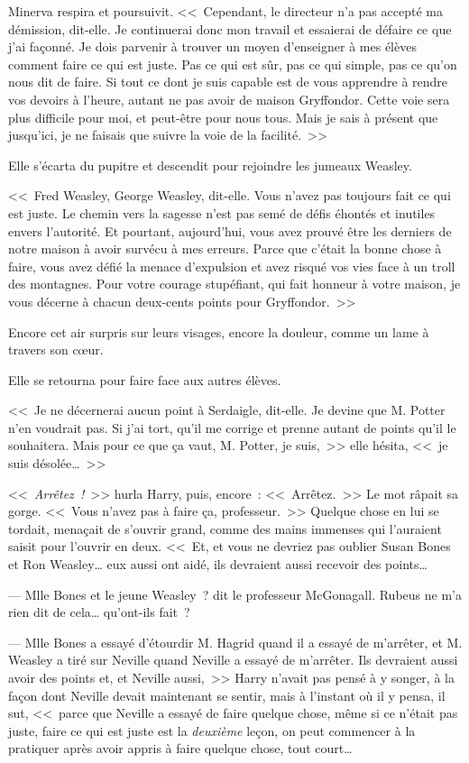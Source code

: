 Minerva respira et poursuivit. <<~Cependant, le directeur n'a pas accepté ma démission, dit-elle. Je continuerai donc mon travail et essaierai de défaire ce que j'ai façonné. Je dois parvenir à trouver un moyen d'enseigner à mes élèves comment faire ce qui est juste. Pas ce qui est sûr, pas ce qui simple, pas ce qu'on nous dit de faire. Si tout ce dont je suis capable est de vous apprendre à rendre vos devoirs à l'heure, autant ne pas avoir de maison Gryffondor. Cette voie sera plus difficile pour moi, et peut-être pour nous tous. Mais je sais à présent que jusqu'ici, je ne faisais que suivre la voie de la facilité.~>>

Elle s'écarta du pupitre et descendit pour rejoindre les jumeaux Weasley.

<<~Fred Weasley, George Weasley, dit-elle. Vous n'avez pas toujours fait ce qui est juste. Le chemin vers la sagesse n'est pas semé de défis éhontés et inutiles envers l'autorité. Et pourtant, aujourd'hui, vous avez prouvé être les derniers de notre maison à avoir survécu à mes erreurs. Parce que c'était la bonne chose à faire, vous avez défié la menace d'expulsion et avez risqué vos vies face à un troll des montagnes. Pour votre courage stupéfiant, qui fait honneur à votre maison, je vous décerne à chacun deux-cents points pour Gryffondor.~>>

Encore cet air surpris sur leurs visages, encore la douleur, comme un lame à travers son cœur.

Elle se retourna pour faire face aux autres élèves.

<<~Je ne décernerai aucun point à Serdaigle, dit-elle. Je devine que M. Potter n'en voudrait pas. Si j'ai tort, qu'il me corrige et prenne autant de points qu'il le souhaitera. Mais pour ce que ça vaut, M. Potter, je suis,~>> elle hésita, <<~je suis désolée…~>>

\later

<<~\emph{Arrêtez~!}~>> hurla Harry, puis, encore~: <<~Arrêtez.~>> Le mot râpait sa gorge. <<~Vous n'avez pas à faire ça, professeur.~>> Quelque chose en lui se tordait, menaçait de s'ouvrir grand, comme des mains immenses qui l'auraient saisit pour l'ouvrir en deux. <<~Et, et vous ne devriez pas oublier Susan Bones et Ron Weasley… eux aussi ont aidé, ils devraient aussi recevoir des points…

--- Mlle Bones et le jeune Weasley~? dit le professeur McGonagall. Rubeus ne m'a rien dit de cela… qu'ont-ils fait~?

--- Mlle Bones a essayé d'étourdir M. Hagrid quand il a essayé de m'arrêter, et M. Weasley a tiré sur Neville quand Neville a essayé de m'arrêter. Ils devraient aussi avoir des points et, et Neville aussi,~>> Harry n'avait pas pensé à y songer, à la façon dont Neville devait maintenant se sentir, mais à l'instant où il y pensa, il sut, <<~parce que Neville a essayé de faire quelque chose, même si ce n'était pas juste, faire ce qui est juste est la \emph{deuxième} leçon, on peut commencer à la pratiquer après avoir appris à faire quelque chose, tout court…

